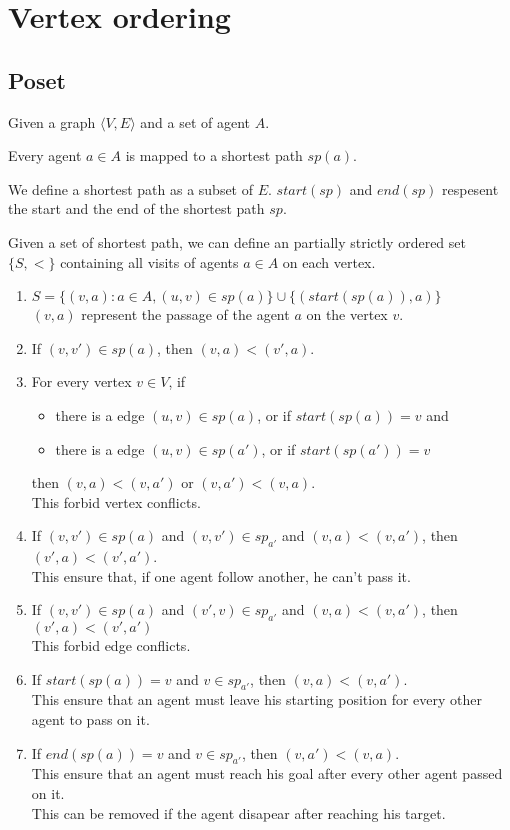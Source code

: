 \section{Vertex ordering}\label{sec:vo}

\subsection{Poset}

Given a graph $\langle V,E \rangle$ and a set of agent $A$.

Every agent $a \in A$ is mapped to a shortest path $sp(a)$.

We define a shortest path as a subset of $E$.
$start(sp)$ and $end(sp)$ respesent the start and the end of the shortest path $sp$.

Given a set of shortest path, we can define an partially strictly ordered set $\{S,<\}$
containing all visits of agents $a \in A$ on each vertex.

\begin{enumerate}
  \item $S = \{(v,a) : a \in A, (u,v) \in sp(a)\} \cup \{(start(sp(a)),a)\}$
  \\ $(v,a)$ represent the passage of the agent $a$ on the vertex $v$.
  \item If $(v,v') \in sp(a)$, then $(v,a)<(v',a)$.\label{succ}
  \item For every vertex $v \in V$, if
  \begin{itemize}
    \item there is a edge $(u,v) \in sp(a)$, or if $start(sp(a))=v$ and
    \item there is a edge $(u,v) \in sp(a')$, or if $start(sp(a'))=v$
  \end{itemize}
  then $(v,a)<(v,a')$ or $(v,a')<(v,a)$.
  \\ This forbid vertex conflicts.\label{vercon}
  \item If $(v,v') \in sp(a)$ and $(v,v') \in sp_{a'}$ and $(v,a)<(v,a')$, then $(v',a)<(v',a')$.
  \\ This ensure that, if one agent follow another, he can't pass it.
  \item If $(v,v') \in sp(a)$ and $(v',v) \in sp_{a'}$ and $(v,a)<(v,a')$, then $(v',a)<(v',a')$
  \\ This forbid edge conflicts.\label{edgcon}
  \item If $start(sp(a))=v$ and $v \in sp_{a'}$, then $(v,a)<(v,a')$.
  \\ This ensure that an agent must leave his starting position for every other agent to pass on it.
  \item If $end(sp(a))=v$ and $v \in sp_{a'}$, then $(v,a')<(v,a)$.
  \\ This ensure that an agent must reach his goal after every other agent passed on it.
  \\ This can be removed if the agent disapear after reaching his target.
\end{enumerate}

